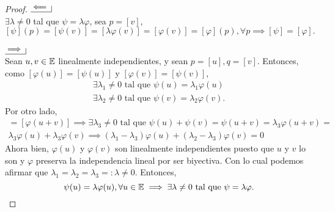 \begin{proof}
    $\bimpliedby$ \\
    $\exists \lambda \neq 0$ tal que $\psi = \lambda\varphi$, sea $p = [v]$, 
    $[\psi](p) = [\psi(v)] = [\lambda\varphi(v)] = [\varphi(v)] = [\varphi](p), 
    \forall p \implies [\psi] = [\varphi].$ \\ \\
    $\bimplies$ \\
    Sean $u, v \in \mathbb{E}$ linealmente independientes, y sean $p = [u], q = [v]$. 
    Entonces, como $[\varphi(u)] = [\psi(u)]$ y $[\varphi(v)] = [\psi(v)]$,
    \begin{gather*}
        \exists \lambda_1 \neq 0 \text{ tal que } \psi(u) = \lambda_1 \varphi(u) \\
        \exists \lambda_2 \neq 0 \text{ tal que } \psi(v) = \lambda_2 \varphi(v).
    \end{gather*}
    Por otro lado,
    \begin{gather*}
        [\psi(u+v)] = [\varphi(u+v)] \implies \exists \lambda_3 \neq 0 \text{ tal que } 
        \psi(u) + \psi(v) = \psi(u+v) = \lambda_3 \varphi(u+v) = \\ \lambda_3
        \varphi(u) + \lambda_3 \varphi(v) \implies (\lambda_1 - \lambda_3) 
        \varphi(u) + (\lambda_2-\lambda_3) \varphi(v) = 0
    \end{gather*}
    Ahora bien, $\varphi(u)$ y $\varphi(v)$ son linealmente independientes puesto que
    $u$ y $v$ lo son y $\varphi$ preserva la independencia lineal por ser biyectiva.
    Con lo cual podemos afirmar que $ \lambda_1 = \lambda_2 = 
    \lambda_3 =: \lambda \neq 0.$ Entonces,
    \[
        \psi(u) = \lambda \varphi(u), \forall u \in \mathbb{E} \implies \exists 
        \lambda \neq 0 \text{ tal que } \psi = \lambda \varphi.
    \]
\end{proof}
